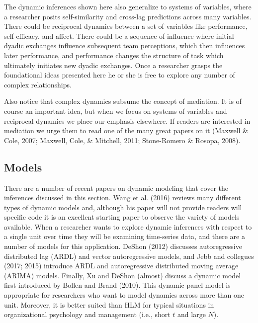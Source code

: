 \documentclass[english,,man]{apa6}
\theoremstyle{definition}
\theoremstyle{definition}
\theoremstyle{definition}
\theoremstyle{remark}
\begin{document}
The dynamic inferences shown here also generalize to systems of
variables, where a researcher posits self-similarity and cross-lag
predictions across many variables. There could be reciprocal dynamics
between a set of variables like performance, self-efficacy, and affect.
There could be a sequence of influence where initial dyadic exchanges
influence subsequent team perceptions, which then influences later
performance, and performance changes the structure of task which
ultimately initiates new dyadic exchanges. Once a researcher grasps the
foundational ideas presented here he or she is free to explore any
number of complex relationships.

Also notice that complex dynamics subsume the concept of mediation. It
is of course an important idea, but when we focus on systems of
variables and reciprocal dynamics we place our emphasis elsewhere. If
readers are interested in mediation we urge them to read one of the many
great papers on it (Maxwell \& Cole, 2007; Maxwell, Cole, \& Mitchell,
2011; Stone-Romero \& Rosopa, 2008).

\hypertarget{models-3}{%
\subsection{Models}\label{models-3}}

There are a number of recent papers on dynamic modeling that cover the
inferences discussed in this section. Wang et al. (2016) reviews many
different types of dynamic models and, although his paper will not
provide readers will specific code it is an excellent starting paper to
observe the variety of models available. When a researcher wants to
explore dynamic inferences with respect to a single unit over time they
will be examining time-series data, and there are a number of models for
this application. DeShon (2012) discusses autoregressive distributed lag
(ARDL) and vector autoregressive models, and Jebb and collegues (2017;
2015) introduce ARDL and autoregressive distributed moving average
(ARIMA) models. Finally, Xu and DeShon (almost) discuss a dynamic model
first introduced by Bollen and Brand (2010). This dynamic panel model is
appropriate for researchers who want to model dynamics across more than
one unit. Moreover, it is better suited than HLM for typical situations
in organizational psychology and management (i.e., short \(t\) and large
\(N\)).
\end{document}
